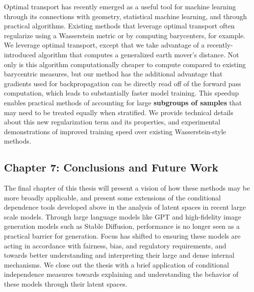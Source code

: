 Optimal transport has recently emerged as a useful tool 
for machine learning through its connections with geometry,
statistical machine learning, and through practical algorithms.
Existing methods that leverage optimal transport often  regularize using 
a Wasserstein metric or by computing barycenters, for example. %
We leverage optimal transport,
except that we take advantage of a recently-introduced algorithm
that computes a generalized earth mover's distance.
Not only is this algorithm computationally cheaper
to compute compared to existing barycentric measures,
but our method has the additional advantage that gradients used for backpropagation 
can be directly read off of the forward pass computation, which leads to substantially faster model training.
This speedup enables practical methods of accounting for large \textbf{subgroups of samples} that
may need to be treated equally when stratified.
We provide technical details about this new regularization term and its properties, 
and 
experimental demonstrations of improved training speed over existing Wasserstein-style methods.

\subsection{Chapter 7: Conclusions and Future Work}
The final chapter of this thesis will
present a 
vision of how these methods may be more broadly applicable,
and present
some extensions of the 
conditional dependence tools
developed above in the analysis of latent spaces in recent large scale models.
Through large language models like GPT
and high-fidelity
image generation models such as Stable Diffusion,
performance is no longer 
seen as a practical barrier for generation.
Focus has shifted to ensuring these models
are acting in accordance with
fairness, bias, and regulatory requirements,
and towards better understanding and interpreting
their large and dense internal mechanisms.
We close out the thesis with a brief application 
of conditional independence measures towards
explaining and understanding the behavior 
of these models through their latent spaces.



